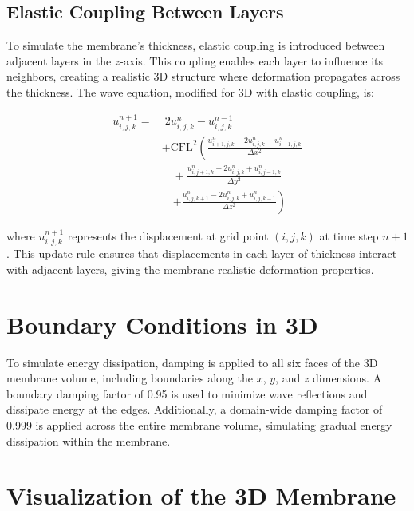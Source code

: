 \documentclass{article}
\begin{document}
\subsection{Elastic Coupling Between Layers}

To simulate the membrane's thickness, elastic coupling is introduced between adjacent layers in the $z$-axis. This coupling enables each layer to influence its neighbors, creating a realistic 3D structure where deformation propagates across the thickness. The wave equation, modified for 3D with elastic coupling, is:

\begin{align}
u_{i, j, k}^{n+1} = & \; 2 u_{i, j, k}^n - u_{i, j, k}^{n-1} \nonumber \\
& + \text{CFL}^2 \left( \frac{u_{i+1, j, k}^n - 2 u_{i, j, k}^n + u_{i-1, j, k}^n}{\Delta x^2} \right. \nonumber \\
& \quad + \frac{u_{i, j+1, k}^n - 2 u_{i, j, k}^n + u_{i, j-1, k}^n}{\Delta y^2} \nonumber \\
& \quad \left. + \frac{u_{i, j, k+1}^n - 2 u_{i, j, k}^n + u_{i, j, k-1}^n}{\Delta z^2} \right)
\end{align}

where $u_{i, j, k}^{n+1}$ represents the displacement at grid point $(i, j, k)$ at time step $n+1$. This update rule ensures that displacements in each layer of thickness interact with adjacent layers, giving the membrane realistic deformation properties.

\section{Boundary Conditions in 3D}

To simulate energy dissipation, damping is applied to all six faces of the 3D membrane volume, including boundaries along the $x$, $y$, and $z$ dimensions. A boundary damping factor of 0.95 is used to minimize wave reflections and dissipate energy at the edges. Additionally, a domain-wide damping factor of 0.999 is applied across the entire membrane volume, simulating gradual energy dissipation within the membrane.

\section{Visualization of the 3D Membrane}
\end{document}
